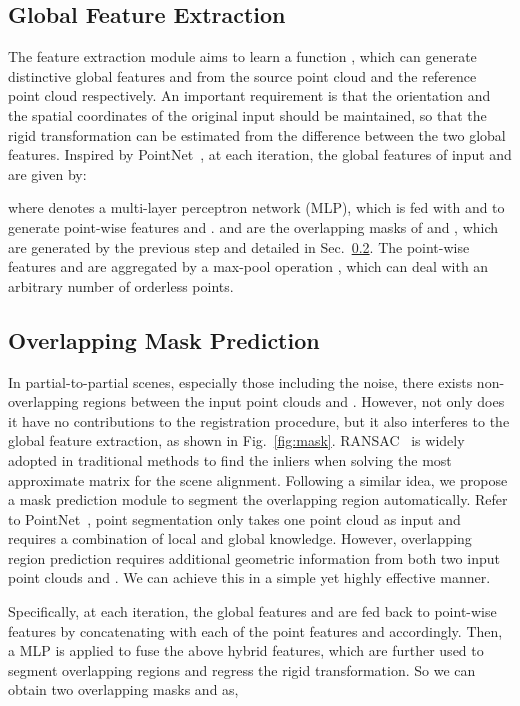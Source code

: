 \documentclass[10pt,twocolumn,letterpaper]{article}
\begin{document}
\subsection{Global Feature Extraction} \label{sec:3.1}
The feature extraction module aims to learn a function , which can generate distinctive global features  and  from the source point cloud  and the reference point cloud  respectively. An important requirement is that the orientation and the spatial coordinates of the original input should be maintained, so that the rigid transformation can be estimated from the difference between the two global features. 
Inspired by PointNet~\cite{qi2017pointnet}, at each iteration, the global features of input  and  are given by:

where  denotes a multi-layer perceptron network (MLP), which is fed with  and  to generate point-wise features  and .  and  are the overlapping masks of  and , which are generated by the previous step and detailed in Sec.~\ref{sec:3.2}. The point-wise features  and  are aggregated by a max-pool operation , which can deal with an arbitrary number of orderless points. 
\subsection{Overlapping Mask Prediction} \label{sec:3.2}
In partial-to-partial scenes, especially those including the noise, there exists non-overlapping regions between the input point clouds  and . However, not only does it have no contributions to the registration procedure, but it also interferes to the global feature extraction, as shown in Fig.~\ref{fig:mask}. RANSAC~\cite{fischler1981random} is widely adopted in traditional methods to find the inliers when solving the most approximate matrix for the scene alignment. Following a similar idea, we propose a mask prediction module to segment the overlapping region automatically. Refer to PointNet~\cite{qi2017pointnet}, point segmentation only takes one point cloud as input and requires a combination of local and global knowledge. However, overlapping region prediction requires additional geometric information from both two input point clouds  and . We can achieve this in a simple yet highly effective manner.

Specifically, at each iteration, the global features  and  are fed back to point-wise features by concatenating with each of the point features  and  accordingly. Then, a MLP  is applied to fuse the above hybrid features, which are further used to segment overlapping regions and regress the rigid transformation. So we can obtain two overlapping masks  and  as,
\end{document}

